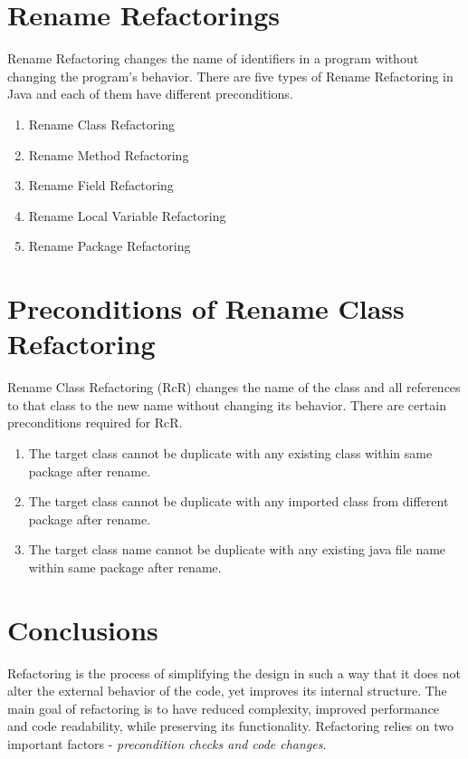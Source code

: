 \documentclass[10pt,conference]{IEEEtran}
\begin{document}
\section{\textbf{Rename Refactorings}}
Rename Refactoring changes the name of identifiers in a program without changing the program's behavior.
There are five types of Rename Refactoring in Java and each of them have different preconditions. 
\begin{enumerate}
	\item Rename Class Refactoring 
	\item Rename Method Refactoring  
	\item Rename Field Refactoring
	\item Rename Local Variable Refactoring
	\item Rename Package Refactoring
\end{enumerate}

\section{\textbf{Preconditions of Rename Class Refactoring}}
Rename Class Refactoring (RcR) changes the name of the class and all references to that class to the new name without changing its behavior. There are certain preconditions required for RcR. 
\begin{enumerate}
	\item The target class cannot be duplicate with any existing class within same package after rename.
	\item The target class cannot be duplicate with any imported class from different package after rename.
	\item The target class name cannot be duplicate with any existing java file name within same package after rename.
\end{enumerate}

\label{sec:precon1}
	
\label{sec:precon2}

\label{sec:precon3}









\newpage

\section{\textbf{Conclusions}}
Refactoring is the process of simplifying the design in such a way that it does not alter the external behavior of the code, yet improves its internal structure. The main goal of refactoring is to have reduced complexity, improved performance and code readability, while preserving its functionality. Refactoring relies on two important factors -  \emph{precondition checks and code changes}.
\end{document}
